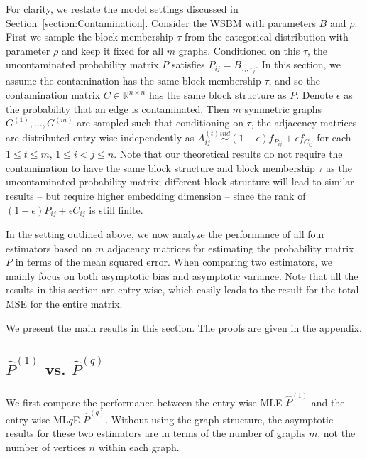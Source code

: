 \documentclass[a4paper]{article}
\renewcommand{\hat}{\widehat}
\begin{document}
For clarity, we restate the model settings discussed in Section~\ref{section:Contamination}. Consider the WSBM with parameters $B$ and $\rho$. First we sample the block membership $\tau$ from the categorical distribution with parameter $\rho$ and keep it fixed for all $m$ graphs. Conditioned on this $\tau$, the uncontaminated probability matrix $P$  satisfies $P_{ij} = B_{\tau_i, \tau_j}$. In this section, we assume the contamination has the same block membership $\tau$, and so the contamination matrix $C \in \mathbb{R}^{n \times n}$ has the same block structure as $P$.  Denote $\epsilon$ as the probability that an edge is contaminated. Then $m$ symmetric graphs $G^{(1)}, \dotsc, G^{(m)}$  are sampled such that conditioning on $\tau$, the adjacency matrices are distributed entry-wise independently as $A^{(t)}_{ij} \stackrel{ind}{\sim} (1-\epsilon) f_{P_{ij}} + \epsilon f_{C_{ij}}$ for each $1 \le t \le m$, $1 \le i < j \le n$. 
Note that our theoretical results do not require the 
contamination to have the same block structure and block membership $\tau$ as the uncontaminated probability matrix; different block structure will lead to similar results -- but require higher embedding dimension -- since the rank of $(1-\epsilon) P_{ij} + \epsilon C_{ij}$ is still finite.

In the setting outlined above, we now analyze the performance of all four estimators based on $m$ adjacency matrices for estimating the probability matrix $P$ in terms of the mean squared error. When comparing two estimators, we mainly focus on both asymptotic bias and asymptotic variance. Note that all the results in this section are entry-wise, which easily leads to the result for the total MSE for the entire matrix.

We present the main results in this section. The proofs are given in the appendix.

\subsection{$\hat{P}^{(1)}$ vs. $\hat{P}^{(q)}$}
\label{section:MLEvsMLqE}
We first compare the performance between the entry-wise MLE $\hat{P}^{(1)}$ and the entry-wise ML$q$E $\hat{P}^{(q)}$. Without using the graph structure, the asymptotic results for these two estimators are in terms of the number of graphs $m$, not the number of vertices $n$ within each graph.
\end{document}
